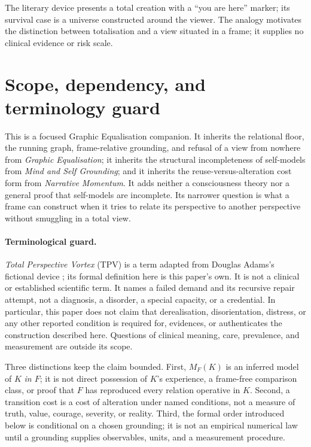 \documentclass[11pt,a4paper]{article}
\theoremstyle{remark}
\begin{document}
The literary device presents a total creation with a ``you are here'' marker;
its survival case is a universe constructed around the viewer. The analogy
motivates the distinction between totalisation and a view situated in a frame;
it supplies no clinical evidence or risk scale.

\section{Scope, dependency, and terminology guard}\label{sec:scope}
This is a focused Graphic Equalisation companion. It inherits the relational
floor, the running graph, frame-relative grounding, and refusal of a view from
nowhere from \emph{Graphic Equalisation}; it inherits the structural
incompleteness of self-models from \emph{Mind and Self Grounding}; and it
inherits the reuse-versus-alteration cost form from \emph{Narrative Momentum}.
It adds neither a consciousness theory nor a general proof that self-models are
incomplete. Its narrower question is what a frame can construct when it tries to
relate its perspective to another perspective without smuggling in a total view.

\paragraph{Terminological guard.} \emph{Total Perspective Vortex} (TPV) is a
term adapted from Douglas Adams's fictional device \citep{adams1980}; its formal definition here is this paper's own. It is not a clinical or established scientific term. It names a failed demand and its recursive repair attempt, not
a diagnosis, a disorder, a special capacity, or a credential. In particular, this
paper does not claim that derealisation, disorientation, distress, or any other
reported condition is required for, evidences, or authenticates the construction
described here. Questions of clinical meaning, care, prevalence, and measurement
are outside its scope.

Three distinctions keep the claim bounded. First, $M_F(K)$ is an inferred model
of $K$ \emph{in $F$}; it is not direct possession of $K$'s experience, a
frame-free comparison class, or proof that $F$ has reproduced every relation
operative in $K$. Second, a transition cost is a cost of alteration under named
conditions, not a measure of truth, value, courage, severity, or reality.
Third, the formal order introduced below is conditional on a chosen grounding;
it is not an empirical numerical law until a grounding supplies observables,
units, and a measurement procedure.
\end{document}
